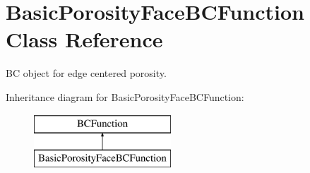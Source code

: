 \hypertarget{class_basic_porosity_face_b_c_function}{\section{Basic\-Porosity\-Face\-B\-C\-Function Class Reference}
\label{class_basic_porosity_face_b_c_function}
}


B\-C object for edge centered porosity.  


Inheritance diagram for Basic\-Porosity\-Face\-B\-C\-Function\-:\begin{figure}[H]
\begin{center}
\leavevmode
\includegraphics[height=2.000000cm]{class_basic_porosity_face_b_c_function}
\end{center}
\end{figure}
